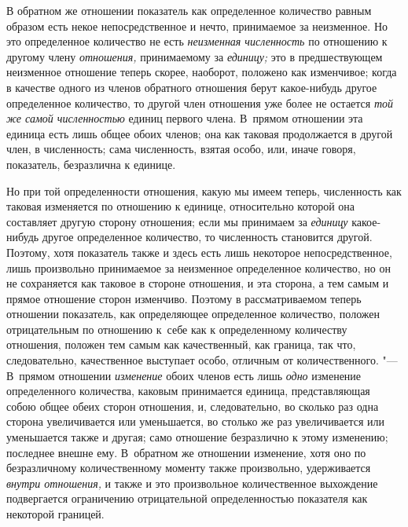 В обратном же отношении показатель как определенное количество равным образом
есть некое непосредственное и нечто, принимаемое за неизменное. Но это
определенное количество не есть {\em неизменная численность} по отношению к
другому члену {\em отношения,} принимаемому за {\em единицу;} это в
предшествующем неизменное отношение теперь скорее, наоборот, положено как
изменчивое; когда в качестве одного из членов обратного отношения берут
какое-нибудь другое определенное количество, то другой член отношения уже более
не остается {\em той же самой численностью} единиц первого члена. В~прямом
отношении эта единица есть лишь общее обоих членов; она как таковая
продолжается в другой член, в численность; сама численность, взятая особо, или,
иначе говоря, показатель, безразлична к единице.

Но при той определенности отношения, какую мы имеем теперь, численность как
таковая изменяется по отношению к единице, относительно которой она составляет
другую сторону отношения; если мы принимаем за {\em единицу} какое-нибудь
другое определенное количество, то численность становится другой. Поэтому, хотя
показатель также и здесь есть лишь некоторое непосредственное, лишь произвольно
принимаемое за неизменное определенное количество, но он не сохраняется как
таковое в стороне отношения, и эта сторона, а тем самым и прямое отношение
сторон изменчиво. Поэтому в рассматриваемом теперь отношении показатель, как
определяющее определенное количество, положен отрицательным по отношению к~себе
как к определенному количеству отношения, положен тем самым как качественный,
как граница, так что, следовательно, качественное выступает особо, отличным от
количественного. "--- В~прямом отношении {\em изменение} обоих членов есть лишь
{\em одно} изменение определенного количества, каковым принимается единица,
представляющая собою общее обеих сторон отношения, и, следовательно, во сколько
раз одна сторона увеличивается или уменьшается, во столько же раз увеличивается
или уменьшается также и другая; само отношение безразлично к этому изменению;
последнее внешне ему. В~обратном же отношении изменение, хотя оно по
безразличному количественному моменту также произвольно, удерживается
{\em внутри отношения,} и также и это произвольное количественное выхождение
подвергается ограничению отрицательной определенностью показателя как
некоторой границей.

